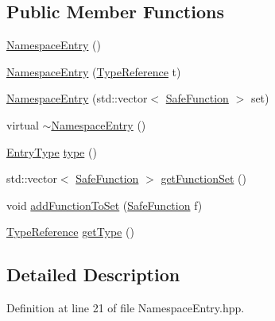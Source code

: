 \subsection*{Public Member Functions}
\begin{DoxyCompactItemize}
\item 
\hyperlink{class_scribble_core_1_1_namespace_entry_aca07766a1f51378c4f8d8dddd074050d}{Namespace\-Entry} ()
\item 
\hyperlink{class_scribble_core_1_1_namespace_entry_a3b2f1f0b64710dfa3c2b957904837300}{Namespace\-Entry} (\hyperlink{namespace_scribble_core_a0e685a305b14aa5f0504df1369ba270b}{Type\-Reference} t)
\item 
\hyperlink{class_scribble_core_1_1_namespace_entry_a621477f47ab28b4c3ccc8fdd627c8818}{Namespace\-Entry} (std\-::vector$<$ \hyperlink{namespace_a_p_i_a45cf1fb9660efbbc53fb7634b0cbd25f}{Safe\-Function} $>$ set)
\item 
virtual \hyperlink{class_scribble_core_1_1_namespace_entry_a9b584261b6b1ac91dbcdf747ab214457}{$\sim$\-Namespace\-Entry} ()
\item 
\hyperlink{namespace_scribble_core_a864d1045f5fe5b53ee7ca934e5de3294}{Entry\-Type} \hyperlink{class_scribble_core_1_1_namespace_entry_a399830ab468bd22366cc50cdad363b06}{type} ()
\item 
std\-::vector$<$ \hyperlink{namespace_a_p_i_a45cf1fb9660efbbc53fb7634b0cbd25f}{Safe\-Function} $>$ \hyperlink{class_scribble_core_1_1_namespace_entry_a471dfc3ce9fabab6224d717be3ce7c6d}{get\-Function\-Set} ()
\item 
void \hyperlink{class_scribble_core_1_1_namespace_entry_a7d8a80a9b2a9b8dd9ee86a378684fad7}{add\-Function\-To\-Set} (\hyperlink{namespace_a_p_i_a45cf1fb9660efbbc53fb7634b0cbd25f}{Safe\-Function} f)
\item 
\hyperlink{namespace_scribble_core_a0e685a305b14aa5f0504df1369ba270b}{Type\-Reference} \hyperlink{class_scribble_core_1_1_namespace_entry_a3f8b0e939240396169df70165c8b47da}{get\-Type} ()
\end{DoxyCompactItemize}


\subsection{Detailed Description}


Definition at line 21 of file Namespace\-Entry.\-hpp.



